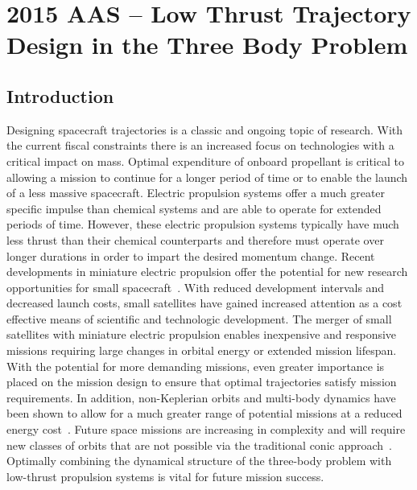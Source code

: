 
\chapter{2015 AAS -- Low Thrust Trajectory Design in the Three Body Problem}
\section{Introduction}\label{sec:introduction}
Designing spacecraft trajectories is a classic and ongoing topic of research.
With the current fiscal constraints there is an increased focus on technologies with a critical impact on mass.
Optimal expenditure of onboard propellant is critical to allowing a mission to continue for a longer period of time or to enable the launch of a less massive spacecraft.
Electric propulsion systems offer a much greater specific impulse than chemical systems and are able to operate for extended periods of time.
However, these electric propulsion systems typically have much less thrust than their chemical counterparts and therefore must operate over longer durations in order to impart the desired momentum change.
Recent developments in miniature electric propulsion offer the potential for new research opportunities for small spacecraft~\cite{haque2013}.
With reduced development intervals and decreased launch costs, small satellites have gained increased attention as a cost effective means of scientific and technologic development. 
The merger of small satellites with miniature electric propulsion enables inexpensive and responsive missions requiring large changes in orbital energy or extended mission lifespan.
With the potential for more demanding missions, even greater importance is placed on the mission design to ensure that optimal trajectories satisfy mission requirements. 
In addition, non-Keplerian orbits and multi-body dynamics have been shown to allow for a much greater range of potential missions at a reduced energy cost~\cite{koon2000}.
Future space missions are increasing in complexity and will require new classes of orbits that are not possible via the traditional conic approach~\cite{ross2006,gomez2001}.
Optimally combining the dynamical structure of the three-body problem with low-thrust propulsion systems is vital for future mission success.

